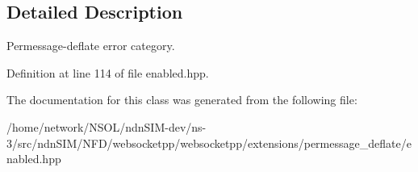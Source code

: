 \subsection{Detailed Description}
Permessage-\/deflate error category. 

Definition at line 114 of file enabled.\+hpp.



The documentation for this class was generated from the following file\+:\begin{DoxyCompactItemize}
\item 
/home/network/\+N\+S\+O\+L/ndn\+S\+I\+M-\/dev/ns-\/3/src/ndn\+S\+I\+M/\+N\+F\+D/websocketpp/websocketpp/extensions/permessage\+\_\+deflate/enabled.\+hpp\end{DoxyCompactItemize}
